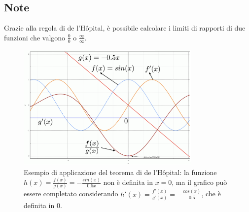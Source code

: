 \documentclass{article}
\begin{document}
\subsection{Note}

Grazie alla regola di de l'H\^opital, è possibile calcolare i limiti di rapporti di due funzioni che valgono $\frac{0}{0}$ o $\frac{\infty}{\infty}$.

\begin{figure}
    \centering
    \includegraphics[width=0.8\textwidth]{Hospital.jpg}
    \caption{Esempio di applicazione del teorema di de l'H\^opital: la funzione $h(x) = \frac{f(x)}{g(x)} = -\frac{sin(x)}{0.5x}$ non è definita in $x=0$, ma il grafico può essere completato considerando $h'(x) = \frac{f'(x)}{g'(x)} = -\frac{cos(x)}{0.5}$, che è definita in 0.}
    \label{fig:my_label}
\end{figure}
\end{document}
